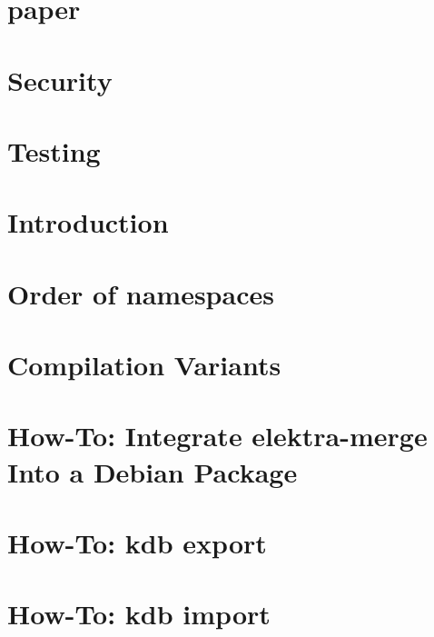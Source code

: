 \documentclass[twoside]{book}
\newcommand{\+}{\discretionary{\mbox{\scriptsize$\hookleftarrow$}}{}{}}
\begin{document}
\chapter{paper}
\label{md_doc_paper_paper}
\hypertarget{md_doc_paper_paper}{}

\chapter{Security}
\label{doc_SECURITY_md}
\hypertarget{doc_SECURITY_md}{}

\chapter{Testing}
\label{doc_TESTING_md}
\hypertarget{doc_TESTING_md}{}

\chapter{Introduction}
\label{doc_tutorials_application-integration_md}
\hypertarget{doc_tutorials_application-integration_md}{}

\chapter{Order of namespaces}
\label{doc_tutorials_cascading_md}
\hypertarget{doc_tutorials_cascading_md}{}

\chapter{Compilation Variants}
\label{doc_tutorials_compilation-variants_md}
\hypertarget{doc_tutorials_compilation-variants_md}{}

\chapter{How-\/\+To\+: Integrate elektra-\/merge Into a Debian Package}
\label{doc_tutorials_elektra-merge-integration_md}
\hypertarget{doc_tutorials_elektra-merge-integration_md}{}

\chapter{How-\/\+To\+: kdb export}
\label{doc_tutorials_export_md}
\hypertarget{doc_tutorials_export_md}{}

\chapter{How-\/\+To\+: kdb import}
\label{doc_tutorials_import_md}
\hypertarget{doc_tutorials_import_md}{}

\end{document}
